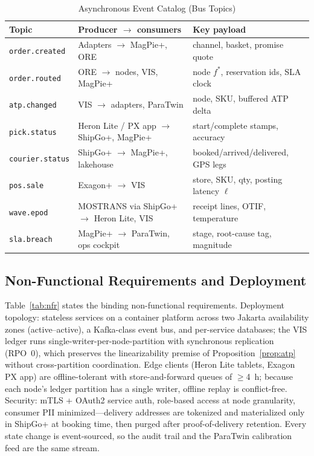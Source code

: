 \documentclass[journal]{IEEEtran}
\begin{document}
\begin{table}[!t]
\caption{Asynchronous Event Catalog (Bus Topics)}
\label{tab:events}
\centering
\scriptsize
\begin{tabularx}{\columnwidth}{@{}l >{\raggedright\arraybackslash}p{25mm} X@{}}
\toprule
\textbf{Topic} & \textbf{Producer $\to$ consumers} & \textbf{Key payload} \\
\midrule
\texttt{order.created} & Adapters $\to$ MagPie+, ORE & channel, basket, promise quote \\
\texttt{order.routed} & ORE $\to$ nodes, VIS, MagPie+ & node $f^\ast$, reservation ids, SLA clock \\
\texttt{atp.changed} & VIS $\to$ adapters, ParaTwin & node, SKU, buffered ATP delta \\
\texttt{pick.status} & Heron Lite / PX app $\to$ ShipGo+, MagPie+ & start/complete stamps, accuracy \\
\texttt{courier.status} & ShipGo+ $\to$ MagPie+, lakehouse & booked/arrived/delivered, GPS legs \\
\texttt{pos.sale} & Exagon+ $\to$ VIS & store, SKU, qty, posting latency $\ell$ \\
\texttt{wave.epod} & MOSTRANS via ShipGo+ $\to$ Heron Lite, VIS & receipt lines, OTIF, temperature \\
\texttt{sla.breach} & MagPie+ $\to$ ParaTwin, ops cockpit & stage, root-cause tag, magnitude \\
\bottomrule
\end{tabularx}
\end{table}

\subsection{Non-Functional Requirements and Deployment}
Table~\ref{tab:nfr} states the binding non-functional requirements. Deployment topology: stateless services on a container platform across two Jakarta availability zones (active--active), a Kafka-class event bus, and per-service databases; the VIS ledger runs single-writer-per-node-partition with synchronous replication (RPO~0), which preserves the linearizability premise of Proposition~\ref{prop:atp} without cross-partition coordination. Edge clients (Heron Lite tablets, Exagon PX app) are offline-tolerant with store-and-forward queues of $\ge$4~h; because each node's ledger partition has a single writer, offline replay is conflict-free. Security: mTLS + OAuth2 service auth, role-based access at node granularity, consumer PII minimized---delivery addresses are tokenized and materialized only in ShipGo+ at booking time, then purged after proof-of-delivery retention. Every state change is event-sourced, so the audit trail and the ParaTwin calibration feed are the same stream.
\end{document}
